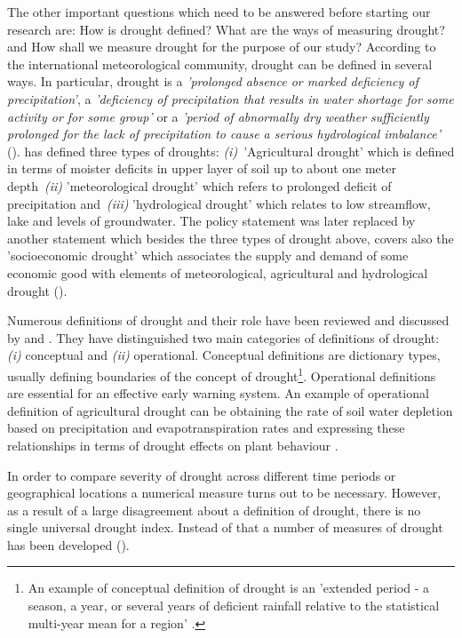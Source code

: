 \documentclass[a4paper,12pt]{article}
\begin{document}
The other important questions which need to be answered before starting our research are: How is drought defined? What are the ways of measuring drought? and How shall we measure drought for the purpose of our study? According to the international meteorological community, drought can be defined in several ways. In particular, drought is a \textit{'prolonged absence or marked deficiency of precipitation'}, a \textit{'deficiency of precipitation that results in water shortage for some activity or for some group'} or a \textit{'period of abnormally dry weather sufficiently prolonged for the lack of precipitation to cause a serious hydrological imbalance'} (\citealp{Heim2002, IPCCtrenberth}).
 \cite{AMS1997} has defined three types of droughts: \textit{(i)}~'Agricultural drought' which is defined in terms of moister deficits in upper layer of soil up to about one meter depth~\textit{(ii)} 'meteorological drought' which refers to prolonged deficit of precipitation and~\textit{(iii)} 'hydrological drought' which relates to low streamflow, lake and levels of groundwater. The  \cite{AMS1997} policy statement was later replaced by another statement \citep{AMS2013} which besides the three types of drought above, covers also the 'socioeconomic drought' which associates the supply and demand of some economic good with elements of meteorological, agricultural and hydrological drought (\citealt{Heim2002, IPCCtrenberth}).
 
Numerous definitions of drought and their role have been reviewed and discussed by \cite{wilhite1985} and \cite{wilhite2000}. They have distinguished two main categories of definitions of drought: \textit{(i)} conceptual and \textit{(ii)} operational. Conceptual definitions are dictionary types, usually defining boundaries of the concept of drought\footnote{An example of conceptual definition of drought is an 'extended period - a season, a year, or several years of deficient rainfall relative to the statistical multi-year mean for a region' \cite{schneider1996}.}. Operational definitions are essential for an effective early warning system. An example of operational definition of agricultural drought can be obtaining the rate of soil water depletion based on precipitation and evapotranspiration rates and expressing these relationships in terms of drought effects on plant behaviour \citep{wilhite2000}.

In order to compare severity of drought across different time periods or geographical locations a numerical measure turns out to be necessary. However, as a result of a large disagreement about a definition of drought, there is no single universal drought index. Instead of that a number of measures of drought has been developed (\citealp{ wilhite1985, wilhite2000, Heim2002}).
\end{document}
